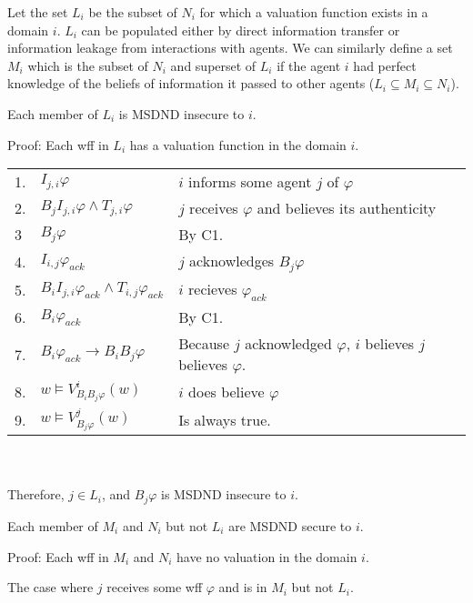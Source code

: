 Let the set $L_i$ be the subset of $N_i$ for which a valuation function exists in a domain $i$. $L_i$ can be populated either by direct information transfer or information leakage from interactions with agents. We can similarly define a set $M_i$ which is the subset of $N_i$ and superset of $L_i$ if the agent $i$ had perfect knowledge of the beliefs of information it passed to other agents ($L_i \subseteq M_i \subseteq N_i$).

\begin{thm}
Each member of $L_i$ is MSDND insecure to $i$.
\end{thm}

Proof: Each wff in $L_i$ has a valuation function in the domain $i$.

\begin{table}[h!]
\centering
\small
\begin{tabularx}{\linewidth}{l l X}
1. & $I_{j,i} \varphi$ & $i$ informs some agent $j$ of $\varphi$ \\
2. & $B_{j}I_{j,i} \varphi \wedge T_{j,i} \varphi$ & $j$ receives $\varphi$ and believes its authenticity \\
3  & $B_j \varphi$ & By C1. \\
4. & $I_{i,j} \varphi_{ack}$ & $j$ acknowledges $B_j \varphi$ \\
5. & $B_{i}I_{j,i} \varphi_{ack} \wedge T_{i,j} \varphi_{ack}$ & $i$ recieves $\varphi_{ack}$ \\
6. & $B_{i} \varphi_{ack}$ & By C1. \\
7. & $B_{i} \varphi_{ack} \rightarrow B_i B_j \varphi$ & Because $j$ acknowledged $\varphi$, $i$ believes $j$ believes $\varphi$. \\
8. & $w \vDash V_{B_i B_j \varphi}^{i}(w)$ & $i$ does believe $\varphi$ \\
9. & $w \vDash V_{B_j \varphi}^{j}(w)$ & Is always true. %
\end{tabularx} \\~\\
Therefore, $j \in L_i$, and $B_j \varphi$ is MSDND insecure to $i$.
\label{tab:lsetsecurity}
\end{table}

\begin{thm}
Each member of $M_i$ and $N_i$ but not $L_i$ are MSDND secure to $i$.
\end{thm}

Proof: Each wff in $M_i$ and $N_i$ have no valuation in the domain $i$.

\begin{case}
The case where $j$ receives some wff $\varphi$ and is in $M_i$ but not $L_i$.
\end{case}

